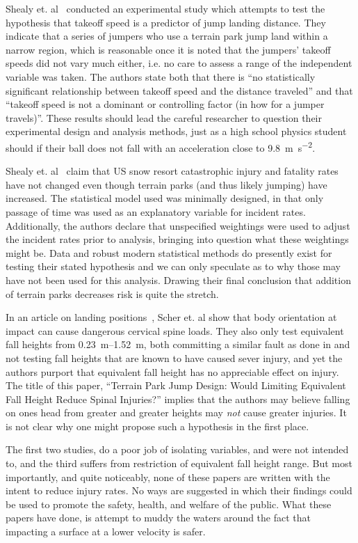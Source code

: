 \documentclass{article}
\begin{document}
Shealy et. al~\cite{Shealy2010} conducted an experimental study which attempts
to test the hypothesis that takeoff speed is a predictor of jump landing
distance. They indicate that a series of jumpers who use a terrain park jump
land within a narrow region, which is reasonable once it is noted that the
jumpers' takeoff speeds did not vary much either, i.e. no care to assess a
range of the independent variable was taken. The authors state both that there
is ``no statistically significant relationship between takeoff speed and the
distance traveled'' and that ``takeoff speed is not a dominant or controlling
factor (in how for a jumper travels)''. These results should lead the careful
researcher to question their experimental design and analysis methods, just as
a high school physics student should if their ball does not fall with an
acceleration close to 9.8~\si{\meter\per\second\squared}.

Shealy et. al~\cite{Shealy2015} claim that US snow resort catastrophic injury
and fatality rates have not changed even though terrain parks (and thus likely
jumping) have increased. The statistical model used was minimally designed, in
that only passage of time was used as an explanatory variable for incident
rates. Additionally, the authors declare that unspecified weightings were used
to adjust the incident rates prior to analysis, bringing into question what
these weightings might be. Data and robust modern statistical methods do
presently exist for testing their stated hypothesis and we can only speculate
as to why those may have not been used for this analysis. Drawing their final
conclusion that addition of terrain parks decreases risk is quite the stretch.

In an article on landing positions~\cite{Scher2015}, Scher et. al show that
body orientation at impact can cause dangerous cervical spine loads.  They also
only test equivalent fall heights from \SIrange{0.23}{1.52}{\meter}, both
committing a similar fault as done in \cite{Shealy2010} and not testing fall
heights that are known to have caused sever injury, and yet the authors purport
that equivalent fall height has no appreciable effect on injury. The title of
this paper, ``Terrain Park Jump Design: Would Limiting Equivalent Fall Height
Reduce Spinal Injuries?'' implies that the authors may believe falling on ones
head from greater and greater heights may \emph{not} cause greater injuries. It
is not clear why one might propose such a hypothesis in the first place.

The first two studies, do a poor job of isolating variables, and were not
intended to, and the third suffers from restriction of equivalent fall height
range. But most importantly, and quite noticeably, none of these papers are
written with the intent to reduce injury rates. No ways are suggested in which
their findings could be used to promote the safety, health, and welfare of the
public. What these papers have done, is attempt to muddy the waters around the
fact that impacting a surface at a lower velocity is safer.
\end{document}

